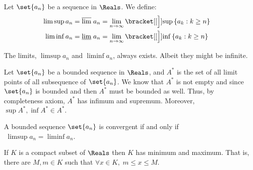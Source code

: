 


Let \(\set{a_n}\) be a sequence in \(\Reals\). We define:
\begin{align*}
    \limsup a_n & = \overline{\lim} \; a_n = \lim_{n \to \infty} \bracket[[\Big]]{\sup{\{a_k : k\geq n\}}}  \\
    \liminf a_n & = \underline{\lim} \; a_n = \lim_{n \to \infty} \bracket[[\Big]]{\inf{\{a_k : k\geq n\}}}
\end{align*}

\begin{note}
    The limits, \(\limsup a_n \) and \(\liminf a_n\), always exists. Albeit they might be infinite.
\end{note}

Let \(\set{a_n}\) be a bounded sequence in \(\Reals\), and \(A^*\) is the set of all limit points of all subsequence of  \(\set{a_n}\). We know that \(A^*\) is not empty and since  \(\set{a_n}\) is bounded and then \(A^*\) must be bounded as well. Thus, by completeness axiom, \(A^*\) has infimum and supremum. Moreover, \(\sup A^*, \inf A^* \in A^*\).

\begin{proposition}
    A bounded sequence \(\set{a_n}\) is convergent if and only if \(\;\limsup a_n = \liminf a_n\).
\end{proposition}

\begin{corollary}
    If \(K\) is a compact subset of \(\Reals\) then \(K\) has minimum and maximum. That is, there are \(M,m \in K\) such that \(\forall x \in K,\; m \leq x \leq M\).
\end{corollary}

